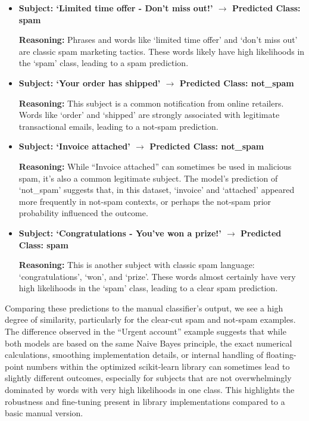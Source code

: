 \documentclass[12pt,letterpaper]{article}
\begin{document}
\begin{itemize}
    \item \textbf{Subject: `Limited time offer - Don't miss out!' $\rightarrow$ Predicted Class: spam}
    
    \textbf{Reasoning:} Phrases and words like `limited time offer' and `don't miss out' are classic spam marketing tactics. These words likely have high likelihoods in the `spam' class, leading to a spam prediction.

    \item \textbf{Subject: `Your order has shipped' $\rightarrow$ Predicted Class: not\_spam}
    
    \textbf{Reasoning:} This subject is a common notification from online retailers. Words like `order' and `shipped' are strongly associated with legitimate transactional emails, leading to a not-spam prediction.

    \item \textbf{Subject: `Invoice attached' $\rightarrow$ Predicted Class: not\_spam}
    
    \textbf{Reasoning:} While ``Invoice attached'' can sometimes be used in malicious spam, it's also a common legitimate subject. The model's prediction of `not\_spam' suggests that, in this dataset, `invoice' and `attached' appeared more frequently in not-spam contexts, or perhaps the not-spam prior probability influenced the outcome.

    \item \textbf{Subject: `Congratulations - You've won a prize!' $\rightarrow$ Predicted Class: spam}
    
    \textbf{Reasoning:} This is another subject with classic spam language: `congratulations', `won', and `prize'. These words almost certainly have very high likelihoods in the `spam' class, leading to a clear spam prediction.
\end{itemize}

Comparing these predictions to the manual classifier's output, we see a high degree of similarity, particularly for the clear-cut spam and not-spam examples. The difference observed in the ``Urgent account'' example suggests that while both models are based on the same Naive Bayes principle, the exact numerical calculations, smoothing implementation details, or internal handling of floating-point numbers within the optimized scikit-learn library can sometimes lead to slightly different outcomes, especially for subjects that are not overwhelmingly dominated by words with very high likelihoods in one class. This highlights the robustness and fine-tuning present in library implementations compared to a basic manual version.
\end{document}
